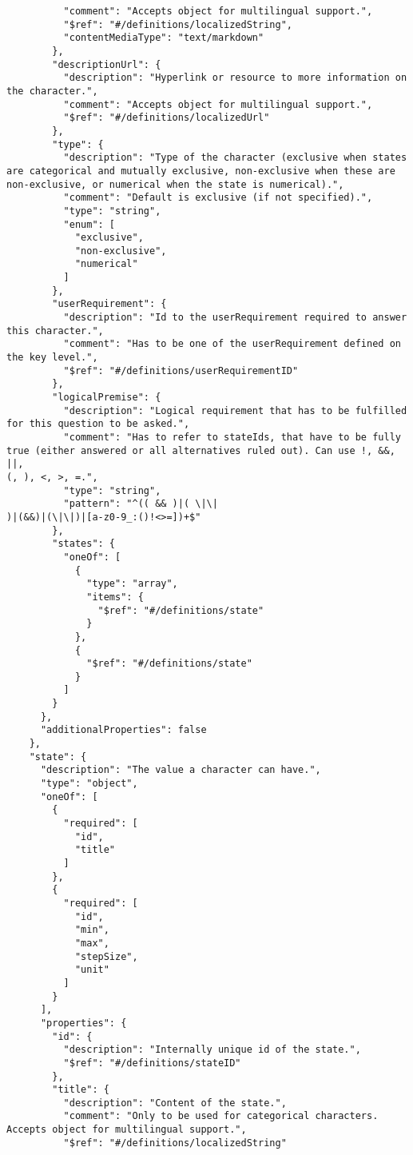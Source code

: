 \documentclass[10pt,letterpaper]{article}
\begin{document}
\begin{verbatim}
          "comment": "Accepts object for multilingual support.",
          "$ref": "#/definitions/localizedString",
          "contentMediaType": "text/markdown"
        },
        "descriptionUrl": {
          "description": "Hyperlink or resource to more information on
the character.",
          "comment": "Accepts object for multilingual support.",
          "$ref": "#/definitions/localizedUrl"
        },
        "type": {
          "description": "Type of the character (exclusive when states
are categorical and mutually exclusive, non-exclusive when these are
non-exclusive, or numerical when the state is numerical).",
          "comment": "Default is exclusive (if not specified).",
          "type": "string",
          "enum": [
            "exclusive",
            "non-exclusive",
            "numerical"
          ]
        },
        "userRequirement": {
          "description": "Id to the userRequirement required to answer
this character.",
          "comment": "Has to be one of the userRequirement defined on
the key level.",
          "$ref": "#/definitions/userRequirementID"
        },
        "logicalPremise": {
          "description": "Logical requirement that has to be fulfilled
for this question to be asked.",
          "comment": "Has to refer to stateIds, that have to be fully
true (either answered or all alternatives ruled out). Can use !, &&, ||,
(, ), <, >, =.",
          "type": "string",
          "pattern": "^(( && )|( \|\|
)|(&&)|(\|\|)|[a-z0-9_:()!<>=])+$"
        },
        "states": {
          "oneOf": [
            {
              "type": "array",
              "items": {
                "$ref": "#/definitions/state"
              }
            },
            {
              "$ref": "#/definitions/state"
            }
          ]
        }
      },
      "additionalProperties": false
    },
    "state": {
      "description": "The value a character can have.",
      "type": "object",
      "oneOf": [
        {
          "required": [
            "id",
            "title"
          ]
        },
        {
          "required": [
            "id",
            "min",
            "max",
            "stepSize",
            "unit"
          ]
        }
      ],
      "properties": {
        "id": {
          "description": "Internally unique id of the state.",
          "$ref": "#/definitions/stateID"
        },
        "title": {
          "description": "Content of the state.",
          "comment": "Only to be used for categorical characters.
Accepts object for multilingual support.",
          "$ref": "#/definitions/localizedString"

\end{verbatim}
\end{document}
